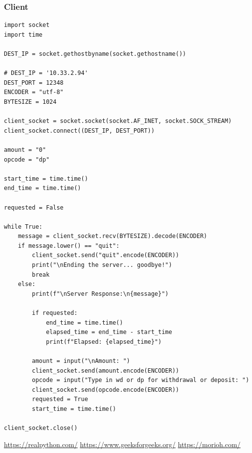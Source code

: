 \documentclass[11pt]{article}
\begin{document}
\subsubsection*{Client}
\begin{verbatim}
import socket
import time

DEST_IP = socket.gethostbyname(socket.gethostname())

# DEST_IP = '10.33.2.94'
DEST_PORT = 12348
ENCODER = "utf-8"
BYTESIZE = 1024

client_socket = socket.socket(socket.AF_INET, socket.SOCK_STREAM)
client_socket.connect((DEST_IP, DEST_PORT))

amount = "0"
opcode = "dp"

start_time = time.time()
end_time = time.time()

requested = False

while True:
    message = client_socket.recv(BYTESIZE).decode(ENCODER)
    if message.lower() == "quit":
        client_socket.send("quit".encode(ENCODER))
        print("\nEnding the server... goodbye!")
        break
    else:
        print(f"\nServer Response:\n{message}")

        if requested:
            end_time = time.time()
            elapsed_time = end_time - start_time
            print(f"Elapsed: {elapsed_time}")
        
        amount = input("\nAmount: ")
        client_socket.send(amount.encode(ENCODER))
        opcode = input("Type in wd or dp for withdrawal or deposit: ")
        client_socket.send(opcode.encode(ENCODER))
        requested = True
        start_time = time.time()

client_socket.close()
\end{verbatim}

\begin{thebibliography}{1}
     \url{https://realpython.com/}
     \url{https://www.geeksforgeeks.org/}
     \url{https://morioh.com/}
\end{thebibliography}
\end{document}
